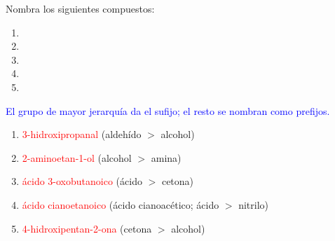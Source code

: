 \begin{exercise}
    Nombra los siguientes compuestos:
    \begin{enumerate}[label=\alph*)]
        \item {}
        \item {}
        \item {}
        \item {}
        \item {}
    \end{enumerate}
    \begin{solu}
        \textcolor{blue}{El grupo de mayor jerarquía da el sufijo; el resto se nombran como prefijos.}
        \begin{enumerate}[label=\alph*)]
            \item \textcolor{red}{3-hidroxipropanal} (aldehído \(>\) alcohol)
            \item \textcolor{red}{2-aminoetan-1-ol} (alcohol \(>\) amina)
            \item \textcolor{red}{ácido 3-oxobutanoico} (ácido \(>\) cetona)
            \item \textcolor{red}{ácido cianoetanoico} (ácido cianoacético; ácido \(>\) nitrilo)
            \item \textcolor{red}{4-hidroxipentan-2-ona} (cetona \(>\) alcohol)
        \end{enumerate}
    \end{solu}
\end{exercise}
